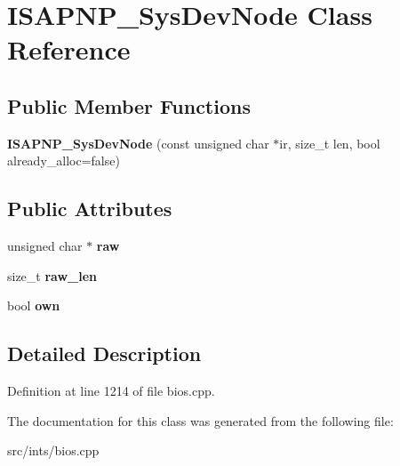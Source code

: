 \hypertarget{classISAPNP__SysDevNode}{\section{I\-S\-A\-P\-N\-P\-\_\-\-Sys\-Dev\-Node Class Reference}
\label{classISAPNP__SysDevNode}
}
\subsection*{Public Member Functions}
\begin{DoxyCompactItemize}
\item 
\hypertarget{classISAPNP__SysDevNode_a08b686d61113d6cd7a7783568515481f}{{\bfseries I\-S\-A\-P\-N\-P\-\_\-\-Sys\-Dev\-Node} (const unsigned char $\ast$ir, size\-\_\-t len, bool already\-\_\-alloc=false)}\label{classISAPNP__SysDevNode_a08b686d61113d6cd7a7783568515481f}

\end{DoxyCompactItemize}
\subsection*{Public Attributes}
\begin{DoxyCompactItemize}
\item 
\hypertarget{classISAPNP__SysDevNode_a88b23d674e4b48999a46d838dff47b7b}{unsigned char $\ast$ {\bfseries raw}}\label{classISAPNP__SysDevNode_a88b23d674e4b48999a46d838dff47b7b}

\item 
\hypertarget{classISAPNP__SysDevNode_a599de9be7c4895bfc76204eed3743fe4}{size\-\_\-t {\bfseries raw\-\_\-len}}\label{classISAPNP__SysDevNode_a599de9be7c4895bfc76204eed3743fe4}

\item 
\hypertarget{classISAPNP__SysDevNode_a0a342171b0ed0789f665868c14e9e6cc}{bool {\bfseries own}}\label{classISAPNP__SysDevNode_a0a342171b0ed0789f665868c14e9e6cc}

\end{DoxyCompactItemize}


\subsection{Detailed Description}


Definition at line 1214 of file bios.\-cpp.



The documentation for this class was generated from the following file\-:\begin{DoxyCompactItemize}
\item 
src/ints/bios.\-cpp\end{DoxyCompactItemize}
